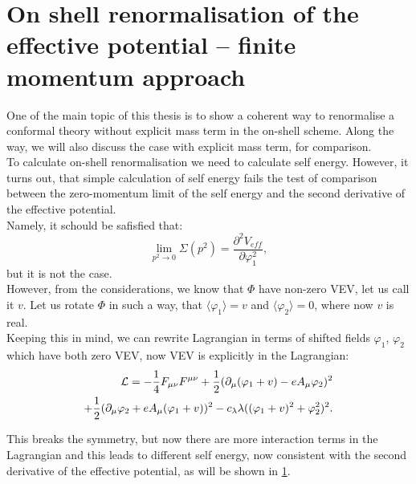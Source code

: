 \chapter{On shell renormalisation of the effective potential -- finite momentum approach}

One of the main topic of this thesis is to show a coherent way to renormalise a conformal theory 
without explicit mass term in the on-shell scheme. Along the way, we will also discuss 
the case with explicit mass term, for comparison.\\

To calculate on-shell renormalisation we need to calculate self energy. 
However, it turns out, that simple calculation of self energy fails the test of 
comparison between the zero-momentum limit of the self energy and the second derivative 
of the effective potential. \\
Namely, it schould be safisfied that:
\begin{equation}\label{second_derivativ_condition}
\lim\limits_{p^2\to 0}\Sigma(p^2)=\frac{\partial^2V_{eff}}{\partial\varphi_1^2},
\end{equation}
but it is not the case. \\

However, from the \MSbar considerations, we know that $\Phi$ have non-zero VEV, let us 
call it $v$. 
Let us rotate $\Phi$ in such a way, that $\langle\varphi_1\rangle=v$ and $\langle\varphi_2\rangle 
= 0$, where now $v$ is real. \\
Keeping this in mind, we can rewrite Lagrangian in terms of shifted fields $\varphi_1$, 
$\varphi_2$ which have both zero VEV, now VEV is explicitly in the Lagrangian:
\begin{align}\label{no_mass_term}
\mathcal{L} = -\frac{1}{4}F_{\mu\nu}F^{\mu\nu}+ 
\frac{1}{2}(\partial_\mu(\varphi_1+v) - eA_\mu\varphi_2)^2\\
+\frac{1}{2}(\partial_\mu\varphi_2+eA_\mu(\varphi_1+v))^2
-c_\lambda\lambda((\varphi_1+v)^2+\varphi_2^2)^2. \notag
\end{align}

This breaks the symmetry, but now there are more interaction terms in the Lagrangian and this leads 
to different self energy, now consistent with the second derivative of the effective potential, 
as will be shown in \ref{}. \\ 

